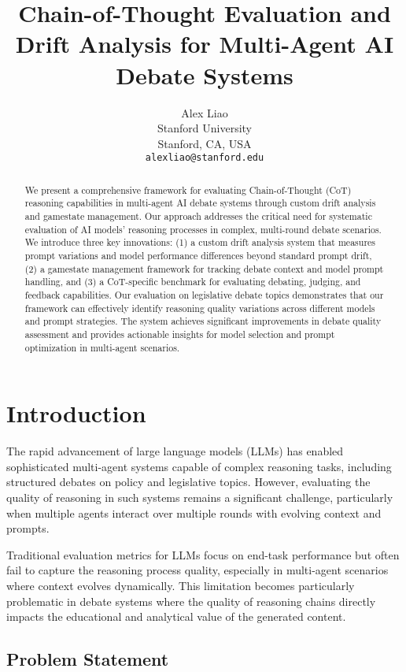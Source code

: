 \documentclass[11pt]{article}
\title{Chain-of-Thought Evaluation and Drift Analysis for Multi-Agent AI Debate Systems}
\author{%
  Alex Liao \\
  Stanford University \\
  Stanford, CA, USA \\
  \texttt{alexliao@stanford.edu} \\
}
\begin{document}
\maketitle

\begin{abstract}
We present a comprehensive framework for evaluating Chain-of-Thought (CoT) reasoning capabilities in multi-agent AI debate systems through custom drift analysis and gamestate management. Our approach addresses the critical need for systematic evaluation of AI models' reasoning processes in complex, multi-round debate scenarios. We introduce three key innovations: (1) a custom drift analysis system that measures prompt variations and model performance differences beyond standard prompt drift, (2) a gamestate management framework for tracking debate context and model prompt handling, and (3) a CoT-specific benchmark for evaluating debating, judging, and feedback capabilities. Our evaluation on legislative debate topics demonstrates that our framework can effectively identify reasoning quality variations across different models and prompt strategies. The system achieves significant improvements in debate quality assessment and provides actionable insights for model selection and prompt optimization in multi-agent scenarios.
\end{abstract}

\section{Introduction}

The rapid advancement of large language models (LLMs) has enabled sophisticated multi-agent systems capable of complex reasoning tasks, including structured debates on policy and legislative topics. However, evaluating the quality of reasoning in such systems remains a significant challenge, particularly when multiple agents interact over multiple rounds with evolving context and prompts.

Traditional evaluation metrics for LLMs focus on end-task performance but often fail to capture the reasoning process quality, especially in multi-agent scenarios where context evolves dynamically. This limitation becomes particularly problematic in debate systems where the quality of reasoning chains directly impacts the educational and analytical value of the generated content.

\subsection{Problem Statement}
\end{document}
